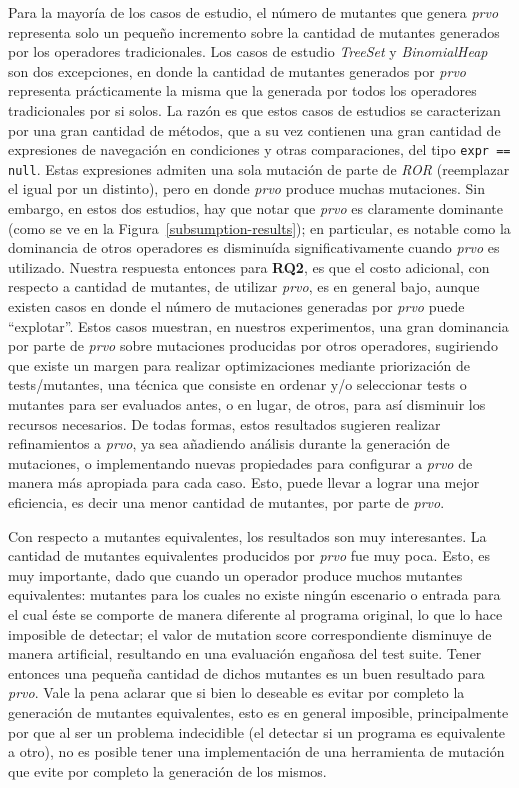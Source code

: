 Para la mayor\'ia de los casos de estudio, el n\'umero de mutantes que genera \emph{prvo} representa solo un peque\~no incremento sobre la cantidad de mutantes generados por los operadores tradicionales. Los casos de estudio \emph{TreeSet} y \emph{BinomialHeap} son dos excepciones, en donde la cantidad de mutantes generados por \emph{prvo} representa pr\'acticamente la misma que la generada por todos los operadores tradicionales por si solos. La raz\'on es que estos casos de estudios se caracterizan por una gran cantidad de m\'etodos, que a su vez contienen una gran cantidad de expresiones de navegaci\'on en condiciones y otras comparaciones, del tipo \texttt{expr == null}. Estas expresiones admiten una sola mutaci\'on de parte de \emph{ROR} (reemplazar el igual por un distinto), pero en donde \emph{prvo} produce muchas mutaciones. Sin embargo, en estos dos estudios, hay que notar que \emph{prvo} es claramente dominante (como se ve en la Figura~\ref{subsumption-results}); en particular, es notable como la dominancia de otros operadores es disminu\'ida significativamente cuando \emph{prvo} es utilizado. Nuestra respuesta entonces para \textbf{RQ2}, es que el costo adicional, con respecto a cantidad de mutantes, de utilizar \emph{prvo}, es en general bajo, aunque existen casos en donde el n\'umero de mutaciones generadas por \emph{prvo} puede ``explotar''. Estos casos muestran, en nuestros experimentos, una gran dominancia por parte de \emph{prvo} sobre mutaciones producidas por otros operadores, sugiriendo que existe un margen para realizar optimizaciones mediante priorizaci\'on de tests/mutantes, una t\'ecnica que consiste en ordenar y/o seleccionar tests o mutantes para ser evaluados antes, o en lugar, de otros, para as\'i disminuir los recursos necesarios. De todas formas, estos resultados sugieren realizar refinamientos a \emph{prvo}, ya sea a\~nadiendo an\'alisis durante la generaci\'on de mutaciones, o implementando nuevas propiedades para configurar a \emph{prvo} de manera m\'as apropiada para cada caso. Esto, puede llevar a lograr una mejor eficiencia, es decir una menor cantidad de mutantes, por parte de \emph{prvo}.

Con respecto a mutantes equivalentes, los resultados son muy interesantes. La cantidad de mutantes equivalentes producidos por \emph{prvo} fue muy poca. Esto, es muy importante, dado que cuando un operador produce muchos mutantes equivalentes: mutantes para los cuales no existe ning\'un escenario o entrada para el cual \'este se comporte de manera diferente al programa original, lo que lo hace imposible de detectar; el valor de mutation score correspondiente disminuye de manera artificial, resultando en una evaluaci\'on enga\~nosa del test suite. Tener entonces una peque\~na cantidad de dichos mutantes es un buen resultado para \emph{prvo}. Vale la pena aclarar que si bien lo deseable es evitar por completo la generaci\'on de mutantes equivalentes, esto es en general imposible, principalmente por que al ser un problema indecidible (el detectar si un programa es equivalente a otro), no es posible tener una implementaci\'on de una herramienta de mutaci\'on que evite por completo la generaci\'on de los mismos.

